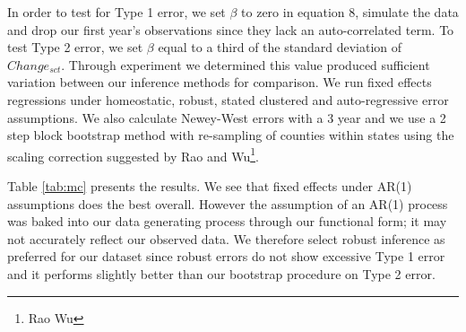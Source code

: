 \documentclass[12pt]{article}
\begin{document}
In order to test for Type 1 error, we set $\beta$ to zero in equation 8, simulate the data and drop our first year's observations since they lack an auto-correlated term. To test Type 2 error, we set $\beta$ equal to a third of the standard deviation of $Change_{sct}$. Through experiment we determined this value produced sufficient variation between our inference methods for comparison. We run fixed effects regressions under homeostatic, robust, stated clustered and auto-regressive error assumptions. We also calculate Newey-West errors with a 3 year and we use a 2 step block bootstrap method with re-sampling of counties within states using the scaling correction suggested by Rao and Wu\footnote{Rao Wu}. 

Table \ref{tab:mc} presents the results. We see that fixed effects under AR(1) assumptions does the best overall. However the assumption of an AR(1) process was baked into our data generating process through our functional form; it may not accurately reflect our observed data. We therefore select robust inference as preferred for our dataset since robust errors do not show excessive Type 1 error and it performs slightly better than our bootstrap procedure on Type 2 error.
\end{document}
